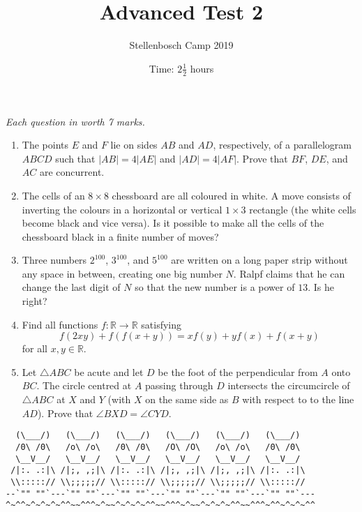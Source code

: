 \documentclass{article}
\title{Advanced Test 2}
\author{Stellenbosch Camp 2019}
\date{Time: $2\frac{1}{2}$ hours}
\begin{document}
\maketitle
\thispagestyle{empty}

\hfill\textit{Each question in worth 7 marks.}

\vfill


\begin{enumerate}[1.]

\item %
The points $E$ and $F$ lie on sides $AB$ and $AD$, respectively, of a parallelogram $ABCD$ such that $|AB| = 4|AE|$ and $|AD| = 4|AF|$.
Prove that $BF$, $DE$, and $AC$ are concurrent.


\item %
The cells of an $8 \times 8$ chessboard are all coloured in white.
A move consists of inverting the colours in a horizontal or vertical $1 \times 3$ rectangle (the white cells become black and vice versa).
Is it possible to make all the cells of the chessboard black in a finite number of moves?


\item %
Three numbers $2^{100}$, $3^{100}$, and $5^{100}$ are written on a long paper strip without any space in between, creating one big number $N$.
Ralpf claims that he can change the last digit of $N$ so that the new number is a power of $13$.
Is he right?


\item
Find all functions $f: \mathbb{R} \to \mathbb{R}$ satisfying
\[ f(2xy) +f(f(x+y)) = xf(y) + yf(x) +f(x+y) \]
for all $x,y \in \mathbb{R}$.


\item %
Let $\triangle ABC$ be acute and let $D$ be the foot of the perpendicular from $A$ onto $BC$.
The circle centred at $A$ passing through $D$ intersects the circumcircle of $\triangle ABC$ at $X$ and $Y$ (with $X$ on the same side as $B$ with respect to to the line $AD$).
Prove that $\angle BXD = \angle CYD$.

\end{enumerate}


\vfill
\begin{center}
\begin{BVerbatim}
  (\___/)   (\___/)   (\___/)   (\___/)   (\___/)   (\___/)
  /0\ /0\   /o\ /o\   /0\ /0\   /O\ /O\   /o\ /o\   /0\ /0\
  \__V__/   \__V__/   \__V__/   \__V__/   \__V__/   \__V__/
 /|:. .:|\ /|;, ,;|\ /|:. .:|\ /|;, ,;|\ /|;, ,;|\ /|:. .:|\
 \\:::::// \\;;;;;// \\:::::// \\;;;;;// \\;;;;;// \\::::://
--`"" ""`---`"" ""`---`"" ""`---`"" ""`---`"" ""`---`"" ""`---
^~^^~^~^~^~^^~~^^^~^~~^~^~^~^^~~^^^~^~~^~^~^~^^~~^^^~^^~^~^~^^
\end{BVerbatim}
\end{center}
\end{document}
